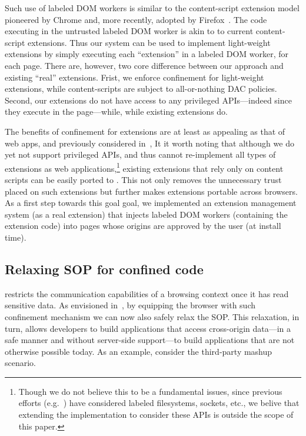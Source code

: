 
Such use of labeled DOM workers is similar to the content-script
extension model pioneered by Chrome and, more recently, adopted by
Firefox~\cite{Carlini:2012}.
%
The code executing in the untrusted labeled DOM worker is akin to
to current content-script extensions.
%
Thus our system can be used to implement light-weight extensions by
simply executing each ``extension'' in a labeled DOM worker, for each
page.
%
There are, however, two core difference between our approach and
existing ``real'' extensions.
%
Frist, we enforce confinement for light-weight extensions, while
content-scripts are subject to all-or-nothing DAC policies.
%
Second, our extensions do not have access to any privileged
APIs---indeed since they execute in the page---while, while existing
extensions do.

The benefits of confinement for extensions are at least as appealing
as that of web apps, and previously considered in~\tocite{},
%
It it worth noting that although we do yet not support privileged
APIs, and thus cannot re-implement all types of extensions as web
applications,\footnote{
  Though we do not believe this to be a fundamental issues, since
  previous efforts (e.g.~\cite{flume}) have considered labeled
  filesystems, sockets, etc., we belive that extending the
  implementation to consider these APIs is outside the scope of this
  paper.
}
existing extensions that rely only on content scripts can be easily
ported to \sys{}.
%
This not only removes the unnecessary trust placed on such extensions
but further makes extensions portable across browsers.
% 
As a first step towards this goal goal, we implemented an extension
management system (as a real extension) that injects labeled DOM
workers (containing the extension code) into pages whose origins are
approved by the user (at install time).
%


\subsection{Relaxing SOP for confined code}
\label{sec:system:mashup}
%
\sys{} restricts the communication capabilities of a browsing context
once it has read sensitive data.
%
As envisioned in~\cite{yang:2013:towards}, by equipping the browser with such
confinement mechanism we can now also safely relax the SOP.
%
This relaxation, in turn, allows developers to build applications that access
cross-origin data---in a safe manner and without server-side support---to build
applications that are not otherwise possible today.
%
As an example, consider the third-party mashup scenario.

